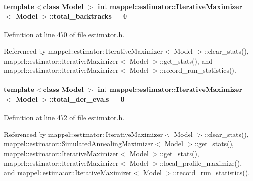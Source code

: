 \paragraph[{\texorpdfstring{total\+\_\+backtracks}{total_backtracks}}]{\setlength{\rightskip}{0pt plus 5cm}template$<$class Model $>$ int {\bf mappel\+::estimator\+::\+Iterative\+Maximizer}$<$ Model $>$\+::total\+\_\+backtracks = 0\hspace{0.3cm}{\ttfamily [protected]}}\hypertarget{classmappel_1_1estimator_1_1IterativeMaximizer_a1e081c237c989c530bb101bfb4791073}{}\label{classmappel_1_1estimator_1_1IterativeMaximizer_a1e081c237c989c530bb101bfb4791073}


Definition at line 470 of file estimator.\+h.



Referenced by mappel\+::estimator\+::\+Iterative\+Maximizer$<$ Model $>$\+::clear\+\_\+stats(), mappel\+::estimator\+::\+Iterative\+Maximizer$<$ Model $>$\+::get\+\_\+stats(), and mappel\+::estimator\+::\+Iterative\+Maximizer$<$ Model $>$\+::record\+\_\+run\+\_\+statistics().

\paragraph[{\texorpdfstring{total\+\_\+der\+\_\+evals}{total_der_evals}}]{\setlength{\rightskip}{0pt plus 5cm}template$<$class Model $>$ int {\bf mappel\+::estimator\+::\+Iterative\+Maximizer}$<$ Model $>$\+::total\+\_\+der\+\_\+evals = 0\hspace{0.3cm}{\ttfamily [protected]}}\hypertarget{classmappel_1_1estimator_1_1IterativeMaximizer_a79461b74a026ab06f9d1b4a9f96bdaa0}{}\label{classmappel_1_1estimator_1_1IterativeMaximizer_a79461b74a026ab06f9d1b4a9f96bdaa0}


Definition at line 472 of file estimator.\+h.



Referenced by mappel\+::estimator\+::\+Iterative\+Maximizer$<$ Model $>$\+::clear\+\_\+stats(), mappel\+::estimator\+::\+Simulated\+Annealing\+Maximizer$<$ Model $>$\+::get\+\_\+stats(), mappel\+::estimator\+::\+Iterative\+Maximizer$<$ Model $>$\+::get\+\_\+stats(), mappel\+::estimator\+::\+Iterative\+Maximizer$<$ Model $>$\+::local\+\_\+profile\+\_\+maximize(), and mappel\+::estimator\+::\+Iterative\+Maximizer$<$ Model $>$\+::record\+\_\+run\+\_\+statistics().

